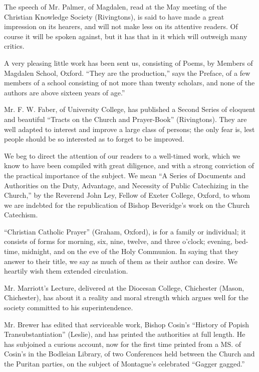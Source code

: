 The speech of Mr. Palmer, of Magdalen, read at the
May meeting of the Christian Knowledge Society (Rivingtons), is said to
have made a great impression on its hearers, and will not make less on
its attentive readers. Of course it will be spoken against, but it has
that in it which will outweigh many critics.

A very pleasing little work has been sent us,
consisting of Poems, by Members of Magdalen School, Oxford. ``They are
the production,'' says the Preface, of a few members of a school
consisting of not more than twenty scholars, and none of the authors are
above sixteen years of age.''

Mr. F. W. Faber, of University College, has
published a Second Series of eloquent and beautiful ``Tracts on the
Church and Prayer-Book'' (Rivingtons). They are well adapted to interest
and improve a large class of persons; the only fear is, lest people
should be so interested as to forget to be improved.

We beg to direct the attention of our readers to a
well-timed work, which we know to have been compiled with great
diligence, and with a strong conviction of the practical importance of
the subject. We mean ``A Series of Documents and Authorities on the Duty,
Advantage, and Necessity of Public Catechizing in the Church,'' by the
Reverend John Ley, Fellow of Exeter College, Oxford, to whom we are
indebted for the republication of Bishop Beveridge's work on the Church
Catechism.

``Christian Catholic Prayer'' (Graham, Oxford), is
for a family or individual; it consists of forms for morning, six, nine,
twelve, and three o'clock; evening, bed-time, midnight, and on the eve
of the Holy Communion. In saying that they answer to their title, we say
as much of them as their author can desire. We heartily wish them
extended circulation.

Mr. Marriott's Lecture, delivered at the Diocesan
College, Chichester (Mason, Chichester), has about it a reality and
moral strength which argues well for the society committed to his
superintendence.

Mr. Brewer has edited that serviceable work, Bishop
Cosin's ``History of Popish Transubstantiation'' (Leslie), and has printed
the authorities at full length. He has subjoined a curious account, now
for the first time printed from a MS. of Cosin's in the Bodleian
Library, of two Conferences held between the Church and the Puritan
parties, on the subject of Montague's celebrated ``Gagger gagged.''

